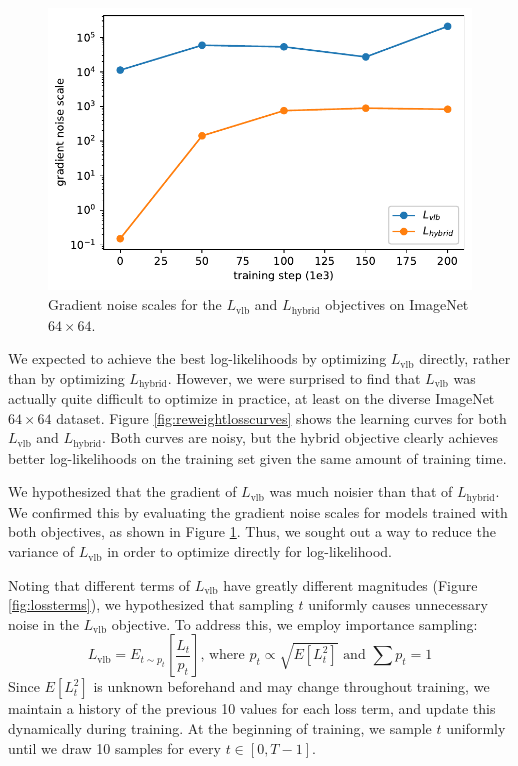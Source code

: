 \documentclass{article}
\begin{document}
\begin{figure}[ht]
\vskip 0.2in
\begin{center}
\centerline{\includegraphics[width=0.8\columnwidth]{noise_scales-eps.pdf}}
\caption{\label{fig:noisescales} Gradient noise scales for the $L_{\text{vlb}}$ and $L_{\text{hybrid}}$ objectives on ImageNet $64 \times 64$.}
\end{center}
\vskip -0.2in
\end{figure}

We expected to achieve the best log-likelihoods by optimizing $L_{\text{vlb}}$ directly, rather than by optimizing $L_{\text{hybrid}}$. However, we were surprised to find that $L_{\text{vlb}}$ was actually quite difficult to optimize in practice, at least on the diverse ImageNet $64 \times 64$ dataset. Figure \ref{fig:reweightlosscurves} shows the learning curves for both $L_{\text{vlb}}$ and $L_{\text{hybrid}}$. Both curves are noisy, but the hybrid objective clearly achieves better log-likelihoods on the training set given the same amount of training time.

We hypothesized that the gradient of $L_{\text{vlb}}$ was much noisier than that of $L_{\text{hybrid}}$. We confirmed this by evaluating the gradient noise scales \citep{gradnoisescale} for models trained with both objectives, as shown in Figure \ref{fig:noisescales}. Thus, we sought out a way to reduce the variance of $L_{\text{vlb}}$ in order to optimize directly for log-likelihood.

Noting that different terms of $L_{\text{vlb}}$ have greatly different magnitudes (Figure \ref{fig:lossterms}), we hypothesized that sampling $t$ uniformly causes unnecessary noise in the $L_{\text{vlb}}$ objective. To address this, we employ importance sampling:
\begin{equation}
L_{\text{vlb}} = E_{t \sim p_t}\left[\frac{L_t}{p_t}\right]\text{, where } p_t \propto \sqrt{E[L_t^2]}\text{ and }\sum p_t = 1
\end{equation}
Since $E[L_t^2]$ is unknown beforehand and may change throughout training, we maintain a history of the previous 10 values for each loss term, and update this dynamically during training. At the beginning of training, we sample $t$ uniformly until we draw 10 samples for every $t \in [0,T-1]$.
\end{document}
